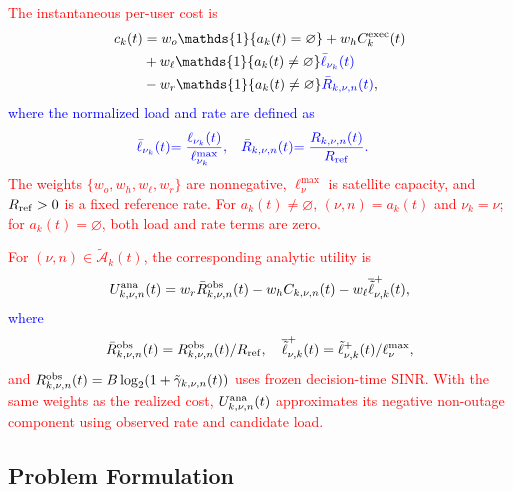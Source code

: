 \documentclass[10pt,letterpaper,journal]{IEEEtran}
\newcommand{\mathbbm}[1]{\mathds{#1}}
\newcommand{\revnew}[1]{\textcolor{red}{#1}}
\begin{document}
\revnew{The instantaneous per-user cost is}
\begin{equation}
\begin{aligned}
c_k(t) &= w_o\mathbbm{1}\{a_k(t)=\varnothing\}
          +w_h C_k^{\rm exec}(t)\\
       &+w_\ell\mathbbm{1}\{a_k(t)\neq\varnothing\}
          \textcolor{blue}{\bar{\ell}_{\nu_k}(t)}\\
       &-w_r\mathbbm{1}\{a_k(t)\neq\varnothing\}
          \textcolor{blue}{\bar{R}_{k,\nu,n}(t)},
\end{aligned}
\label{eq:instantaneous_cost}
\end{equation}
\textcolor{blue}{where the normalized load and rate are defined as}
\begin{equation}
\begin{aligned}
\textcolor{blue}{\bar{\ell}_{\nu_k}(t)}
&\textcolor{blue}{=
\frac{\ell_{\nu_k}(t)}{\ell_{\nu_k}^{\max}},}\quad
\textcolor{blue}{\bar{R}_{k,\nu,n}(t)}
\textcolor{blue}{=
\frac{R_{k,\nu,n}(t)}{R_{\rm ref}}.}
\end{aligned}
\label{eq:normalized_load_rate}
\end{equation}
\revnew{The weights $\{w_o,w_h,w_\ell,w_r\}$ are nonnegative, $\ell_\nu^{\max}$ is satellite capacity, and $R_{\rm ref}>0$ is a fixed reference rate. For $a_k(t)\neq\varnothing$, $(\nu,n)=a_k(t)$ and $\nu_k=\nu$; for $a_k(t)=\varnothing$, both load and rate terms are zero.}

\textcolor{blue}{\revnew{For $(\nu,n)\in\tilde{\mathcal A}_k(t)$, the corresponding analytic utility is}
\begin{equation}
U^{\rm ana}_{k,\nu,n}(t)
=
w_r\bar R^{\rm obs}_{k,\nu,n}(t)
-w_h C_{k,\nu,n}(t)
-w_\ell\overline{\tilde{\ell}}_{\nu,k}^{+}(t),
\label{eq:analytic_utility}
\end{equation}
where
\[
\bar R^{\rm obs}_{k,\nu,n}(t)
=
{R^{\rm obs}_{k,\nu,n}(t)}/{R_{\rm ref}},
\quad
\overline{\tilde{\ell}}_{\nu,k}^{+}(t)
=
{\tilde{\ell}_{\nu,k}^{+}(t)}/{\ell_\nu^{\max}},
\]
\revnew{and $R^{\rm obs}_{k,\nu,n}(t) = B\log_2\!\left(1+\tilde\gamma_{k,\nu,n}(t)\right)$ uses frozen decision-time SINR. With the same weights as the realized cost, $U^{\rm ana}_{k,\nu,n}(t)$ approximates its negative non-outage component using observed rate and candidate load.}}




\vspace{-2mm}
\subsection{Problem Formulation}
\label{subsec:problem}
\end{document}
